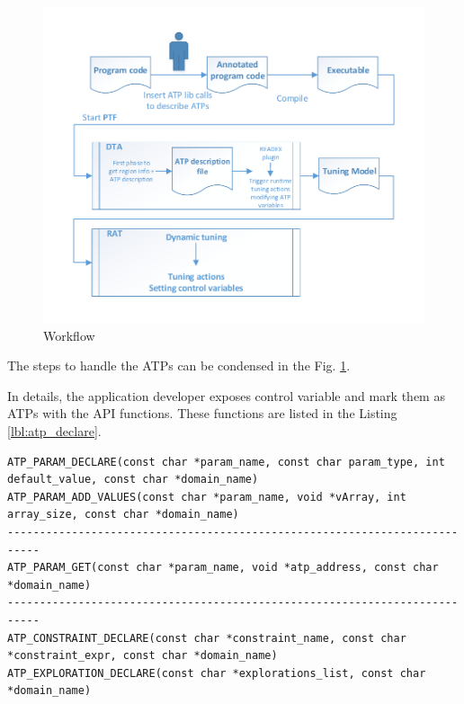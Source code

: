 \begin{figure}
\centering
\includegraphics[width=0.8\columnwidth]{figures/overall_design.pdf} 
\caption{Workflow }
\label{fig_ATP_workflow}
\end{figure} 

The steps to handle the ATPs can be condensed in the Fig. \ref{fig_ATP_workflow}.

In details, the application developer exposes control variable and mark them as ATPs with the API functions. These functions are listed in the Listing \ref{lbl:atp_declare}.

\vspace{0.4cm}
\begin{minipage}{\linewidth}
\begin{lstlisting}[caption={ATP library API functions}, label={lbl:atp_declare}]
ATP_PARAM_DECLARE(const char *param_name, const char param_type, int default_value, const char *domain_name)
ATP_PARAM_ADD_VALUES(const char *param_name, void *vArray, int array_size, const char *domain_name)
---------------------------------------------------------------------------
ATP_PARAM_GET(const char *param_name, void *atp_address, const char *domain_name)
---------------------------------------------------------------------------
ATP_CONSTRAINT_DECLARE(const char *constraint_name, const char *constraint_expr, const char *domain_name)
ATP_EXPLORATION_DECLARE(const char *explorations_list, const char *domain_name)
\end{lstlisting}
\end{minipage}

